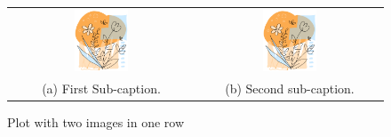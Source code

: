 \begin{figure}[ht]
\centering
\begin{tabular}{cc}
\includegraphics[width=0.3\textwidth]{Chapters/Chapter_2/figures/image1.png} & \includegraphics[width=0.3\textwidth]{Chapters/Chapter_2/figures/image1.png} \\
(a) First Sub-caption. & (b) Second sub-caption. \\
\end{tabular}
\caption{Plot with two images in one row}
\label{fig: figure2_2}
\end{figure}